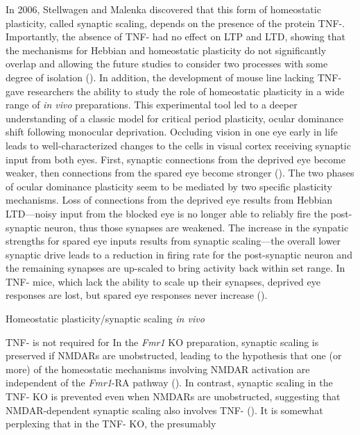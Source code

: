 In 2006, Stellwagen and Malenka discovered that this form of homeostatic plasticity, called synaptic scaling, depends on the presence of the protein TNF-\textalpha{}. Importantly, the absence of TNF-\textalpha{} had no effect on LTP and LTD, showing that the mechanisms for Hebbian and homeostatic plasticity do not significantly overlap and allowing the future studies to consider two processes with some degree of isolation (\cite{Stellwagen2006}). In addition, the development of mouse line lacking TNF-\textalpha{} gave researchers the ability to study the role of homeostatic plasticity in a wide range of \textit{in vivo} preparations. This experimental tool led to a deeper understanding of a classic model for critical period plasticity, ocular dominance shift following monocular deprivation. Occluding vision in one eye early in life leads to well-characterized changes to the cells in visual cortex receiving synaptic input from both eyes. First, synaptic connections from the deprived eye become weaker, then connections from the spared eye become stronger (\cite{Frenkel2004}). The two phases of ocular dominance plasticity seem to be mediated by two specific plasticity mechanisms. Loss of connections from the deprived eye results from Hebbian LTD---noisy input from the blocked eye is no longer able to reliably fire the post-synaptic neuron, thus those synapses are weakened. The increase in the synpatic strengths for spared eye inputs results from synaptic scaling---the overall lower synaptic drive leads to a reduction in firing rate for the post-synaptic neuron and the remaining synapses are up-scaled to bring activity back within set range. In TNF-\textalpha{} mice, which lack the ability to scale up their synapses, deprived eye responses are lost, but spared eye responses never increase (\cite{Kaneko2008}).

Homeostatic plasticity/synaptic scaling \textit{in vivo} \cite{Hengen2013, Keck2013}
\cite{Ranson2012}

TNF-\textalpha{} is not required for 
In the \textit{Fmr1} KO preparation, synaptic scaling is preserved if NMDARs are unobstructed, leading to the hypothesis that one (or more) of the homeostatic mechanisms involving NMDAR activation are independent of the \textit{Fmr1}-RA pathway (\cite{Soden2010}). In contrast, synaptic scaling in the TNF-\textalpha{} KO is prevented even when NMDARs are unobstructed, suggesting that NMDAR-dependent synaptic scaling also involves TNF-\textalpha{} (\cite{Stellwagen2006}). It is somewhat perplexing that in the TNF-\textalpha{} KO, the presumably 


